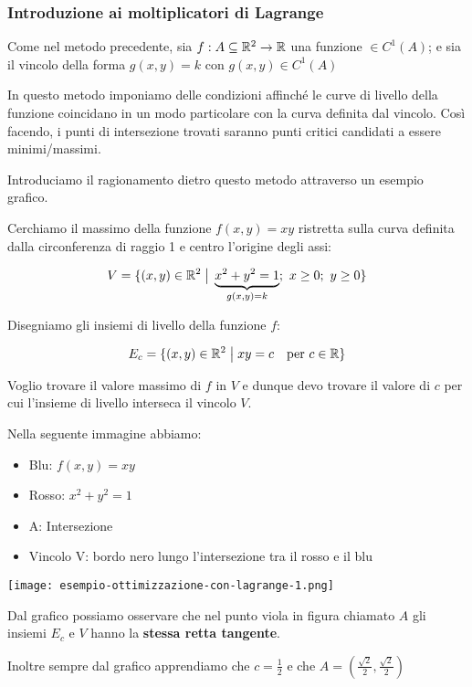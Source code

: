 \pagebreak
\subsubsection{Introduzione ai moltiplicatori di Lagrange}

Come nel metodo precedente, sia \(f: A \subseteq \mathbb{R}^2 \to \mathbb{R} \) una funzione \(\in C^1(A)\); e sia il vincolo della forma \(g(x,y) = k\) con \(g(x,y) \in C^{1}(A)\)

In questo metodo imponiamo delle condizioni affinché le curve di livello della funzione coincidano in un modo particolare con la curva definita dal vincolo. Così facendo, i punti di intersezione trovati saranno punti critici candidati a essere minimi/massimi.

Introduciamo il ragionamento dietro questo metodo attraverso un esempio grafico.

Cerchiamo il massimo della funzione \(f(x,y) = xy\) ristretta sulla curva definita dalla circonferenza di raggio 1 e centro l'origine degli assi:

\[
    V = \{(x,y) \in \mathbb{R}^{2} \;\big|\; \underbrace{ x^{2}+y^{2}=1}_{g(x,y) = k} ;\  x \ge 0 ;\ y \ge 0 \}
\]

Disegniamo gli insiemi di livello della funzione \(f\):

\[
    E_c = \{(x,y) \in \mathbb{R}^{2} \;\big|\; xy = c \quad\text{per } c \in \mathbb{R} \}
\]

Voglio trovare il valore massimo di \(f\) in \(V\) e dunque devo trovare il valore di \(c\) per cui l'insieme di livello interseca il vincolo \(V\).

Nella seguente immagine abbiamo:
\begin{itemize}
    \item Blu: \(f(x,y) = xy\)
    \item Rosso: \(x^2 + y^2 = 1\)
    \item A{:} Intersezione
    \item Vincolo V{:} bordo nero lungo l'intersezione tra il rosso e il blu
\end{itemize}

\begin{center}
    \texttt{[image: esempio-ottimizzazione-con-lagrange-1.png]}
\end{center}

Dal grafico possiamo osservare che nel punto viola in figura chiamato \(A\) gli insiemi \(E_c\) e \(V\) hanno la \textbf{stessa retta tangente}.

Inoltre sempre dal grafico apprendiamo che \(c = \frac{1}{2}\) e che \(A = \left(\frac{\sqrt{2}}{2}, \frac{\sqrt{2}}{2}\right)\)

